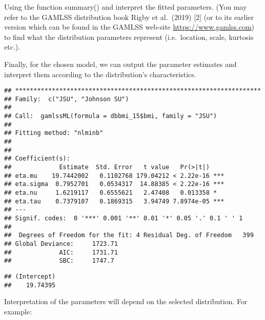 Using the function summary() and interpret the fitted parameters. (You
may refer to the GAMLSS distribution book Rigby et al.~(2019) {[}2{]}
(or to its earlier version which can be found in the GAMLSS web-site
\url{https://www.gamlss.com}) to find what the distribution parameters
represent (i.e.~location, scale, kurtosis etc.).

Finally, for the chosen model, we can output the parameter estimates and
interpret them according to the distribution's characteristics.

\begin{Shaded}
\begin{Highlighting}[]
\end{Highlighting}
\end{Shaded}

\begin{verbatim}
## *******************************************************************
## Family:  c("JSU", "Johnson SU") 
## 
## Call:  gamlssML(formula = dbbmi_15$bmi, family = "JSU") 
## 
## Fitting method: "nlminb" 
## 
## 
## Coefficient(s):
##             Estimate  Std. Error   t value   Pr(>|t|)    
## eta.mu    19.7442002   0.1102768 179.04212 < 2.22e-16 ***
## eta.sigma  0.7952701   0.0534317  14.88385 < 2.22e-16 ***
## eta.nu     1.6219117   0.6555621   2.47408   0.013358 *  
## eta.tau    0.7379107   0.1869315   3.94749 7.8974e-05 ***
## ---
## Signif. codes:  0 '***' 0.001 '**' 0.01 '*' 0.05 '.' 0.1 ' ' 1
## 
##  Degrees of Freedom for the fit: 4 Residual Deg. of Freedom   399 
## Global Deviance:     1723.71 
##             AIC:     1731.71 
##             SBC:     1747.7
\end{verbatim}

\begin{Shaded}
\begin{Highlighting}[]
\SpecialCharTok{$}
\end{Highlighting}
\end{Shaded}

\begin{verbatim}
## (Intercept) 
##    19.74395
\end{verbatim}

Interpretation of the parameters will depend on the selected
distribution. For example:

